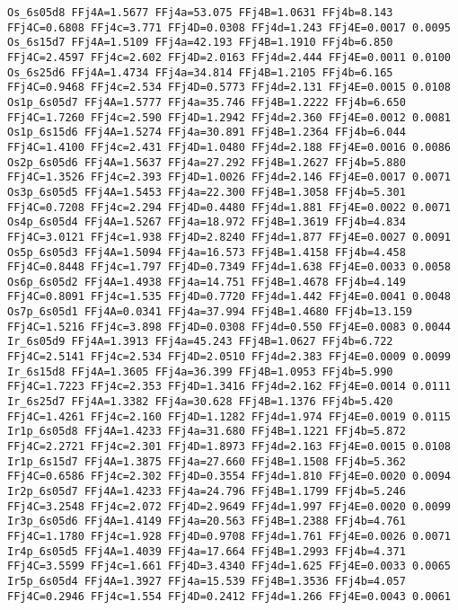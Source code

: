 {\begin{verbatim}
Os_6s05d8 FFj4A=1.5677 FFj4a=53.075 FFj4B=1.0631 FFj4b=8.143 FFj4C=0.6808 FFj4c=3.771 FFj4D=0.0308 FFj4d=1.243 FFj4E=0.0017 0.0095 
Os_6s15d7 FFj4A=1.5109 FFj4a=42.193 FFj4B=1.1910 FFj4b=6.850 FFj4C=2.4597 FFj4c=2.602 FFj4D=2.0163 FFj4d=2.444 FFj4E=0.0011 0.0100 
Os_6s25d6 FFj4A=1.4734 FFj4a=34.814 FFj4B=1.2105 FFj4b=6.165 FFj4C=0.9468 FFj4c=2.534 FFj4D=0.5773 FFj4d=2.131 FFj4E=0.0015 0.0108 
Os1p_6s05d7 FFj4A=1.5777 FFj4a=35.746 FFj4B=1.2222 FFj4b=6.650 FFj4C=1.7260 FFj4c=2.590 FFj4D=1.2942 FFj4d=2.360 FFj4E=0.0012 0.0081 
Os1p_6s15d6 FFj4A=1.5274 FFj4a=30.891 FFj4B=1.2364 FFj4b=6.044 FFj4C=1.4100 FFj4c=2.431 FFj4D=1.0480 FFj4d=2.188 FFj4E=0.0016 0.0086 
Os2p_6s05d6 FFj4A=1.5637 FFj4a=27.292 FFj4B=1.2627 FFj4b=5.880 FFj4C=1.3526 FFj4c=2.393 FFj4D=1.0026 FFj4d=2.146 FFj4E=0.0017 0.0071 
Os3p_6s05d5 FFj4A=1.5453 FFj4a=22.300 FFj4B=1.3058 FFj4b=5.301 FFj4C=0.7208 FFj4c=2.294 FFj4D=0.4480 FFj4d=1.881 FFj4E=0.0022 0.0071 
Os4p_6s05d4 FFj4A=1.5267 FFj4a=18.972 FFj4B=1.3619 FFj4b=4.834 FFj4C=3.0121 FFj4c=1.938 FFj4D=2.8240 FFj4d=1.877 FFj4E=0.0027 0.0091 
Os5p_6s05d3 FFj4A=1.5094 FFj4a=16.573 FFj4B=1.4158 FFj4b=4.458 FFj4C=0.8448 FFj4c=1.797 FFj4D=0.7349 FFj4d=1.638 FFj4E=0.0033 0.0058 
Os6p_6s05d2 FFj4A=1.4938 FFj4a=14.751 FFj4B=1.4678 FFj4b=4.149 FFj4C=0.8091 FFj4c=1.535 FFj4D=0.7720 FFj4d=1.442 FFj4E=0.0041 0.0048 
Os7p_6s05d1 FFj4A=0.0341 FFj4a=37.994 FFj4B=1.4680 FFj4b=13.159 FFj4C=1.5216 FFj4c=3.898 FFj4D=0.0308 FFj4d=0.550 FFj4E=0.0083 0.0044 
Ir_6s05d9 FFj4A=1.3913 FFj4a=45.243 FFj4B=1.0627 FFj4b=6.722 FFj4C=2.5141 FFj4c=2.534 FFj4D=2.0510 FFj4d=2.383 FFj4E=0.0009 0.0099 
Ir_6s15d8 FFj4A=1.3605 FFj4a=36.399 FFj4B=1.0953 FFj4b=5.990 FFj4C=1.7223 FFj4c=2.353 FFj4D=1.3416 FFj4d=2.162 FFj4E=0.0014 0.0111 
Ir_6s25d7 FFj4A=1.3382 FFj4a=30.628 FFj4B=1.1376 FFj4b=5.420 FFj4C=1.4261 FFj4c=2.160 FFj4D=1.1282 FFj4d=1.974 FFj4E=0.0019 0.0115 
Ir1p_6s05d8 FFj4A=1.4233 FFj4a=31.680 FFj4B=1.1221 FFj4b=5.872 FFj4C=2.2721 FFj4c=2.301 FFj4D=1.8973 FFj4d=2.163 FFj4E=0.0015 0.0108 
Ir1p_6s15d7 FFj4A=1.3875 FFj4a=27.660 FFj4B=1.1508 FFj4b=5.362 FFj4C=0.6586 FFj4c=2.302 FFj4D=0.3554 FFj4d=1.810 FFj4E=0.0020 0.0094 
Ir2p_6s05d7 FFj4A=1.4233 FFj4a=24.796 FFj4B=1.1799 FFj4b=5.246 FFj4C=3.2548 FFj4c=2.072 FFj4D=2.9649 FFj4d=1.997 FFj4E=0.0020 0.0099 
Ir3p_6s05d6 FFj4A=1.4149 FFj4a=20.563 FFj4B=1.2388 FFj4b=4.761 FFj4C=1.1780 FFj4c=1.928 FFj4D=0.9708 FFj4d=1.761 FFj4E=0.0026 0.0071 
Ir4p_6s05d5 FFj4A=1.4039 FFj4a=17.664 FFj4B=1.2993 FFj4b=4.371 FFj4C=3.5599 FFj4c=1.661 FFj4D=3.4340 FFj4d=1.625 FFj4E=0.0033 0.0065 
Ir5p_6s05d4 FFj4A=1.3927 FFj4a=15.539 FFj4B=1.3536 FFj4b=4.057 FFj4C=0.2946 FFj4c=1.554 FFj4D=0.2412 FFj4d=1.266 FFj4E=0.0043 0.0061 

\end{verbatim}}
